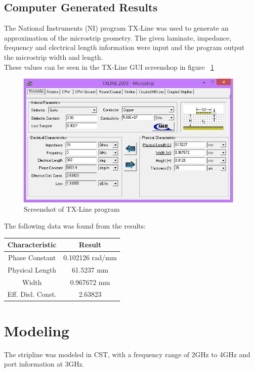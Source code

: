 \documentclass{paper}
\begin{document}
\subsection{Computer Generated Results}
The National Instruments (NI) program TX-Line was used to generate an approximation of the microstrip geometry. The given laminate, impedance, frequency and electrical length information were input and the program output the microstrip width and length. \\

These values can be seen in the TX-Line GUI screenshop in figure ~\ref{fig:txline}  

\begin{figure}[H]
	\centering
	\includegraphics[scale=0.5]{IMG/txline}
	\caption{Screenshot of TX-Line program}
	\label{fig:txline}
\end{figure}

The following data was found from the results:

\begin{center}
	\begin{tabular}{c|c}
		\hline
		Characteristic & Result\\\hline\hline
		Phase Constant & 0.102126 rad/mm\\\hline
		Physical Length & 61.5237 mm\\	\hline
		Width & 0.967672 mm\\\hline
		Eff. Diel. Const. & 2.63823\\\hline
	\end{tabular}
\end{center}

\section{Modeling}
The stripline was modeled in CST, with a frequency range of 2GHz to 4GHz and port information at 3GHz.
\end{document}
